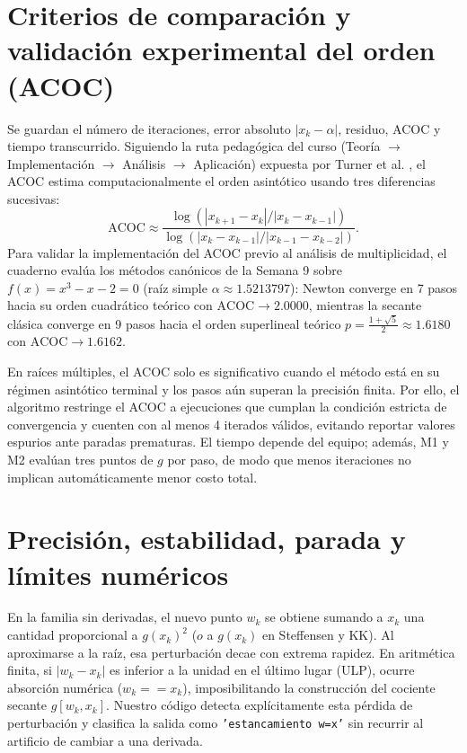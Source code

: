 \documentclass[10pt,a4paper]{article}
\begin{document}
\section{Criterios de comparaci\'on y validaci\'on experimental del orden (ACOC)}
Se guardan el n\'umero de iteraciones, error absoluto $|x_k-\alpha|$, residuo, ACOC y tiempo transcurrido. Siguiendo la ruta pedag\'ogica del curso (Teor\'ia $\to$ Implementaci\'on $\to$ An\'alisis $\to$ Aplicaci\'on) expuesta por Turner et al. \cite{turner}, el ACOC estima computacionalmente el orden asint\'otico usando tres diferencias sucesivas:
\[\mathrm{ACOC}\approx\frac{\log(|x_{k+1}-x_k|/|x_k-x_{k-1}|)}{\log(|x_k-x_{k-1}|/|x_{k-1}-x_{k-2}|)}.\]
Para validar la implementaci\'on del ACOC previo al an\'alisis de multiplicidad, el cuaderno eval\'ua los m\'etodos can\'onicos de la Semana 9 sobre $f(x)=x^3-x-2=0$ (ra\'iz simple $\alpha\approx 1.5213797$): Newton converge en 7 pasos hacia su orden cuadr\'atico te\'orico con $\mathrm{ACOC}\to 2.0000$, mientras la secante cl\'asica converge en 9 pasos hacia el orden superlineal te\'orico $p=\frac{1+\sqrt{5}}{2}\approx 1.6180$ con $\mathrm{ACOC}\to 1.6162$.

En ra\'ices m\'ultiples, el ACOC solo es significativo cuando el m\'etodo est\'a en su r\'egimen asint\'otico terminal y los pasos a\'un superan la precisi\'on finita. Por ello, el algoritmo restringe el ACOC a ejecuciones que cumplan la condici\'on estricta de convergencia y cuenten con al menos 4 iterados v\'alidos, evitando reportar valores espurios ante paradas prematuras. El tiempo depende del equipo; adem\'as, M1 y M2 eval\'uan tres puntos de $g$ por paso, de modo que menos iteraciones no implican autom\'aticamente menor costo total.
\section{Precisión, estabilidad, parada y límites num\'ericos}
En la familia sin derivadas, el nuevo punto $w_k$ se obtiene sumando a $x_k$ una cantidad proporcional a $g(x_k)^2$ ($o$ a $g(x_k)$ en Steffensen y KK). Al aproximarse a la ra\'iz, esa perturbaci\'on decae con extrema rapidez. En aritm\'etica finita, si $|w_k-x_k|$ es inferior a la unidad en el \'ultimo lugar (ULP), ocurre absorci\'on num\'erica ($w_k == x_k$), imposibilitando la construcci\'on del cociente secante $g[w_k,x_k]$. Nuestro c\'odigo detecta expl\'icitamente esta p\'erdida de perturbaci\'on y clasifica la salida como \texttt{'estancamiento w=x'} sin recurrir al artificio de cambiar a una derivada.
\end{document}
